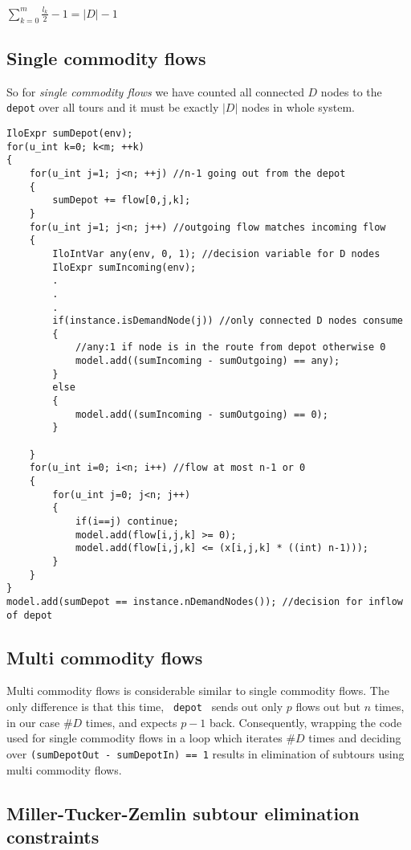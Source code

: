 \begin{center}
$\sum_{k=0}^{m}{\frac{l_k}{2}-1} = |D| - 1$
\end{center}

\subsection{Single commodity flows}

So for {\it single commodity flows} we have counted all connected $D$ nodes to
the \texttt{depot} over all tours and it must be exactly $|D|$ nodes in whole
system.

\begin{lstlisting}
IloExpr sumDepot(env);
for(u_int k=0; k<m; ++k)
{
    for(u_int j=1; j<n; ++j) //n-1 going out from the depot
    {
        sumDepot += flow[0,j,k];
    }
    for(u_int j=1; j<n; j++) //outgoing flow matches incoming flow
    {
        IloIntVar any(env, 0, 1); //decision variable for D nodes
        IloExpr sumIncoming(env);
        .
        .
        .
        if(instance.isDemandNode(j)) //only connected D nodes consume
        {
            //any:1 if node is in the route from depot otherwise 0
            model.add((sumIncoming - sumOutgoing) == any);
        }
        else
        {
            model.add((sumIncoming - sumOutgoing) == 0);
        }

    }
    for(u_int i=0; i<n; i++) //flow at most n-1 or 0
    {
        for(u_int j=0; j<n; j++)
        {
            if(i==j) continue;
            model.add(flow[i,j,k] >= 0);
            model.add(flow[i,j,k] <= (x[i,j,k] * ((int) n-1)));
        }
    }
}
model.add(sumDepot == instance.nDemandNodes()); //decision for inflow of depot
\end{lstlisting}

\subsection{Multi commodity flows}


Multi commodity flows is considerable similar to single commodity flows. The
only difference is that this time, \texttt{ depot } sends out only $p$ flows out
but $n$ times, in our case $\#D$ times, and expects $p-1$ back. Consequently,
wrapping the code used for single commodity flows in a loop which iterates $\#D$
times and deciding over \texttt{(sumDepotOut - sumDepotIn) == 1} results in
elimination of subtours using multi commodity flows.

\subsection{Miller-Tucker-Zemlin subtour elimination constraints}

